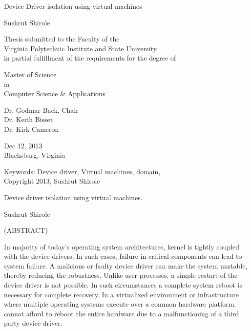 \documentclass[12pt]{report}
\begin{document}
\thispagestyle{empty}
\begin{center}

{\Large 
Device Driver isolation using virtual machines
}

\vfill

Sushrut Shirole

\vfill

Thesis submitted to the Faculty of the \\
Virginia Polytechnic Institute and State University \\
in partial fulfillment of the requirements for the degree of

\vfill

Master of Science \\
in \\
Computer Science \& Applications

\vfill

Dr. Godmar Back, Chair \\
Dr. Keith Bisset \\
Dr. Kirk Cameron\\


\vfill

Dec 12, 2013 \\
Blacksburg, Virginia

\vfill

Keywords: Device driver, Virtual machines, domain,  
\\
Copyright 2013, Sushrut Shirole

\end{center}

\pagebreak

\thispagestyle{empty}
\begin{center}

{\large 
Device driver isolation using virtual machines.
}

\vfill

Sushrut Shirole

\vfill

(ABSTRACT)
\end{center}

In majority of today's operating system architectures, kernel is tightly coupled with the device drivers. In such cases, failure in critical components can lead to system failure.
A malicious or faulty device driver can make the system unstable, thereby reducing the robustness. Unlike user processes, a simple restart of the device driver is not possible. In such circumstances a complete system reboot is necessary for complete recovery. In a virtualized environment or infrastructure where multiple operating systems execute over a common hardware platform, cannot afford to reboot the entire hardware due to a malfunctioning of a third party device driver. 
 
\end{document}
